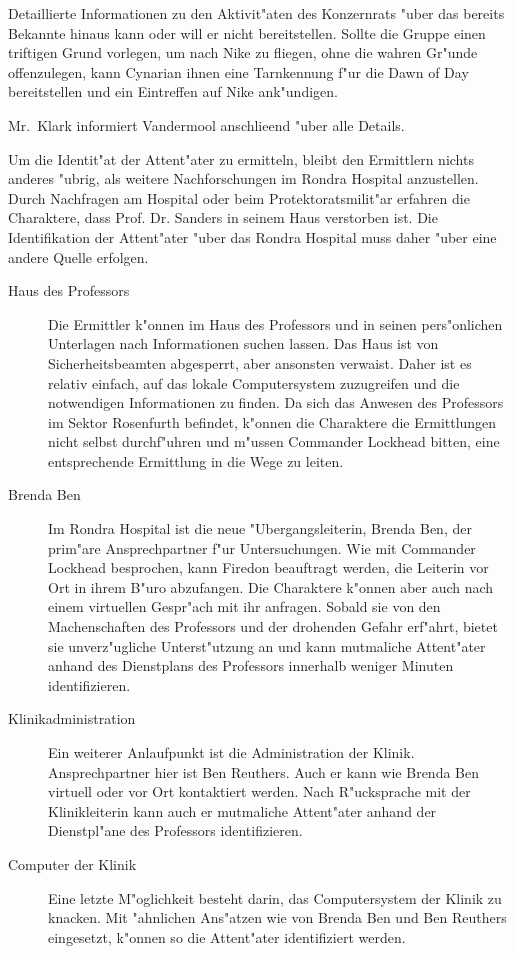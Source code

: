 Detaillierte Informationen zu den Aktivit"aten des Konzernrats "uber das bereits Bekannte hinaus kann oder will er nicht bereitstellen. Sollte die Gruppe einen triftigen Grund vorlegen, um nach Nike zu fliegen, ohne die wahren Gr"unde offenzulegen, kann Cynarian ihnen eine Tarnkennung f"ur die Dawn of Day bereitstellen und ein Eintreffen auf Nike ank"undigen.

Mr.~Klark informiert Vandermool anschlie\3end "uber alle Details.


Um die Identit"at der Attent"ater zu ermitteln, bleibt den Ermittlern nichts anderes "ubrig, als weitere Nachforschungen im Rondra Hospital anzustellen. Durch Nachfragen am Hospital oder beim Protektoratsmilit"ar erfahren die Charaktere, dass Prof. Dr. Sanders in seinem Haus verstorben ist. Die Identifikation der Attent"ater "uber das Rondra Hospital muss daher "uber eine andere Quelle erfolgen.

\begin{description}
	\item[Haus des Professors] Die Ermittler k"onnen im Haus des Professors und in seinen pers"onlichen Unterlagen nach Informationen suchen 
		lassen. Das Haus ist von Sicherheitsbeamten abgesperrt, aber ansonsten verwaist. Daher ist es relativ einfach, auf das lokale Computersystem zuzugreifen und die notwendigen Informationen zu finden. Da sich das Anwesen des Professors im Sektor Rosenfurth befindet, k"onnen die Charaktere die Ermittlungen nicht selbst durchf"uhren und m"ussen Commander Lockhead bitten, eine entsprechende Ermittlung in die Wege zu leiten.
	\item[Brenda Ben] Im Rondra Hospital ist die neue "Ubergangsleiterin, Brenda Ben, der prim"are Ansprechpartner f"ur Untersuchungen. Wie 
		mit Commander Lockhead besprochen, kann Firedon beauftragt werden, die Leiterin vor Ort in ihrem B"uro abzufangen. Die Charaktere k"onnen aber auch nach einem virtuellen Gespr"ach mit ihr anfragen. Sobald sie von den Machenschaften des Professors und der drohenden Gefahr erf"ahrt, bietet sie unverz"ugliche Unterst"utzung an und kann mutma\3liche Attent"ater anhand des Dienstplans des Professors innerhalb weniger Minuten identifizieren.
	\item[Klinikadministration] Ein weiterer Anlaufpunkt ist die Administration der Klinik. Ansprechpartner hier ist Ben Reuthers. Auch er 
		kann wie Brenda Ben virtuell oder vor Ort kontaktiert werden. Nach R"ucksprache mit der Klinikleiterin kann auch er mutma\3liche Attent"ater anhand der Dienstpl"ane des Professors identifizieren.
	\item[Computer der Klinik] Eine letzte M"oglichkeit besteht darin, das Computersystem der Klinik zu knacken. Mit "ahnlichen Ans"atzen wie 
		von Brenda Ben und Ben Reuthers eingesetzt, k"onnen so die Attent"ater identifiziert werden.
\end{description}

